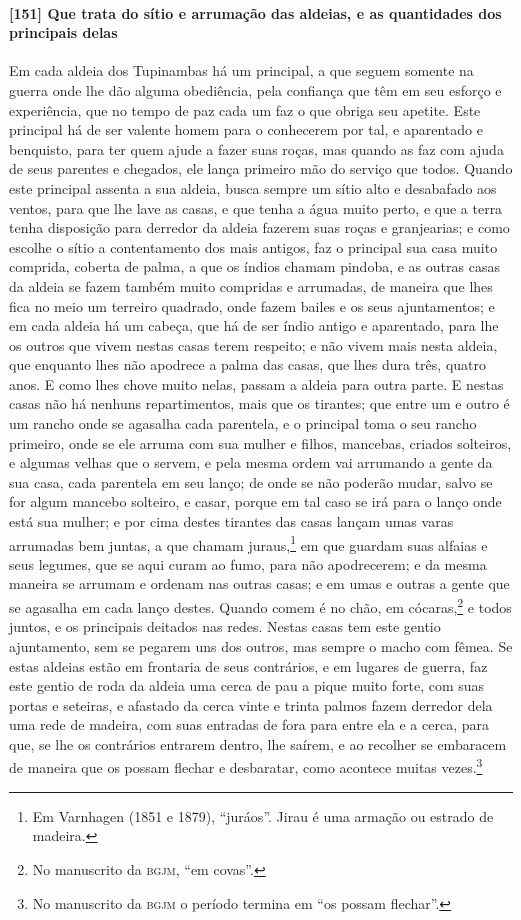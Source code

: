 \begin{linenumbers}
\paragraph{[151] Que trata do sítio e arrumação das aldeias, e as quantidades dos principais
delas}\quad
Em cada aldeia dos Tupinambas há um principal, a que seguem somente na guerra onde lhe dão
alguma obediência, pela confiança que têm em seu esforço e experiência, que no tempo de
paz cada um faz o que obriga seu apetite. Este principal há de ser valente homem para o
conhecerem por tal, e aparentado e benquisto, para ter quem ajude a fazer suas roças, mas
quando as faz com ajuda de seus parentes e chegados, ele lança primeiro mão do serviço que
todos. Quando este principal assenta a sua aldeia, busca sempre um sítio alto e desabafado
aos ventos, para que lhe lave as casas, e que tenha a água muito perto, e que a terra
tenha disposição para derredor da aldeia fazerem suas roças e granjearias; e como escolhe
o sítio a contentamento dos mais antigos, faz o principal sua casa muito comprida, coberta
de palma, a que os índios chamam pindoba, e as outras casas da aldeia se fazem também
muito compridas e arrumadas, de maneira que lhes fica no meio um terreiro quadrado, onde
fazem bailes e os seus ajuntamentos; e em cada aldeia há um cabeça, que há de ser índio
antigo e aparentado, para lhe os outros que vivem nestas casas terem respeito; e não vivem
mais nesta aldeia, que enquanto lhes não apodrece a palma das casas, que lhes dura três,
quatro anos. E como lhes chove muito nelas, passam a aldeia para outra parte. E nestas
casas não há nenhuns repartimentos, mais que os tirantes; que entre um e outro é um rancho
onde se agasalha cada parentela, e o principal toma o seu rancho primeiro, onde se ele
arruma com sua mulher e filhos, mancebas, criados solteiros, e algumas velhas que o
servem, e pela mesma ordem vai arrumando a gente da sua casa, cada parentela em seu lanço;
de onde se não poderão mudar, salvo se for algum mancebo solteiro, e casar, porque em tal
caso se irá para o lanço onde está sua mulher; e por cima destes tirantes das casas lançam
umas varas arrumadas bem juntas, a que chamam juraus,\footnote{ Em Varnhagen (1851 e 1879),
``juráos''. Jirau é uma armação ou estrado de madeira.} em que guardam suas alfaias e
seus legumes, que se aqui curam ao fumo, para não apodrecerem; e da mesma maneira se
arrumam e ordenam nas outras casas; e em umas e outras a gente que se agasalha em cada
lanço destes. Quando comem é no chão, em cócaras,\footnote{ No manuscrito da
\textsc{bgjm}, ``em covas''.} e todos juntos, e os principais deitados nas redes. Nestas
casas tem este gentio ajuntamento, sem se pegarem uns dos outros, mas sempre o macho com
fêmea. Se estas aldeias estão em frontaria de seus contrários, e em lugares de guerra, faz
este gentio de roda da aldeia uma cerca de pau a pique muito forte, com suas portas e
seteiras, e afastado da cerca vinte e trinta palmos fazem derredor dela uma rede de
madeira, com suas entradas de fora para entre ela e a cerca, para que, se lhe os
contrários entrarem dentro, lhe saírem, e ao recolher se embaracem de maneira que os
possam flechar e desbaratar, como acontece muitas vezes.\footnote{ No manuscrito da
\textsc{bgjm} o período termina em ``os possam flechar''.}


\end{linenumbers}
